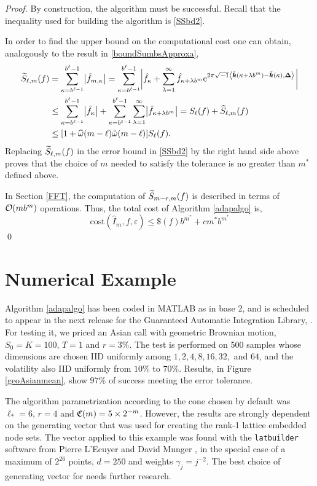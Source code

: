 \documentclass[graybox]{svmult}
\newcommand{\bsDelta}{\boldsymbol{\Delta}}    %
\begin{document}
\begin{proof}
By construction, the algorithm must be successful. Recall that the inequality used for building the algorithm is \eqref{SSbd2}.

In order to find the upper bound on the computational cost one can obtain, analogously to the result in \eqref{boundSumbsApproxa},
\begin{align}
\nonumber
\tS_{\ell,m}(f) &= \sum_{\kappa=b^{\ell-1}}^{b^{\ell}-1} \bigabs{ \tf_{m,\kappa}} = \sum_{\kappa=b^{\ell-1}}^{b^{\ell}-1} \biggabs{\hf_{\kappa} + \sum_{\lambda=1}^{\infty} \hf_{\kappa+\lambda b^{m}} \E^{2 \pi \sqrt{-1} \ip{\tvk(\kappa+\lambda b^{m}) - \tvk(\kappa)}{\bsDelta}}}\\
\nonumber
&\le \sum_{\kappa=b^{\ell-1}}^{b^{\ell}-1} \bigabs{\hf_{\kappa}} + \sum_{\kappa=b^{\ell-1}}^{b^{\ell}-1} \sum_{\lambda=1}^{\infty} \bigabs{\hf_{\kappa+\lambda b^{m}}} 
= S_{\ell}(f) + \hS_{\ell,m}(f) \\
\nonumber
&\le [1  + \homega(m-\ell) \wcomega(m-\ell)] S_\ell(f). \label{SSbd3}
\end{align}
Replacing $\widetilde{S}_{\ell,m}(f)$ in the error bound in \eqref{SSbd2} by the right hand side above proves that the choice of $m$ needed to satisfy the tolerance is no greater than  $m^*$ defined above.

In Section \ref{FFT}, the computation of $\widetilde{S}_{m-r,m}(f)$ is described in terms of $\mathcal{O}(mb^m)$ operations. Thus, the total cost of Algorithm \ref{adapalgo} is,
\[
\mathrm{cost}\left(\widehat{I}_m,f,\varepsilon\right)\leq \$(f)b^{m^*}+cm^*b^{m^*}
\]
\hfill \qed
\end{proof}

\section{Numerical Example} \label{secnumexpsec}

Algorithm \ref{adapalgo} has been coded in MATLAB as \cublat in base 2, and is scheduled to appear in the next release for the Guaranteed Automatic Integration Library, \cite{ChoEtal14a}. For testing it, we priced an Asian call with geometric Brownian motion, $S_0=K=100$, $T=1$ and $r=3\%$. The test is performed on 500 samples whose dimensions are chosen IID uniformly among $1, 2, 4, 8, 16, 32,$ and $64$, and the volatility also IID uniformly from $10\%$ to $70\%$. Results, in Figure \ref{geoAsianmean}, show $97\%$ of success meeting the error tolerance.

The algorithm parametrization according to the cone chosen by default was $\ell_*=6$, $r=4$ and $\mathfrak{C}(m)=5 \times 2^{-m}$. However, the results are strongly dependent on the generating vector that was used for creating the rank-1 lattice embedded node sets. The vector applied to this example was found with the \texttt{latbuilder} software from Pierre L'Ecuyer and David Munger \cite{LEcMun14a}, in the special case of a maximum of $2^{26}$ points, $d=250$ and weights $\gamma_j=j^{-2}$. The best choice of generating vector for \cublat needs further research.
\end{document}
